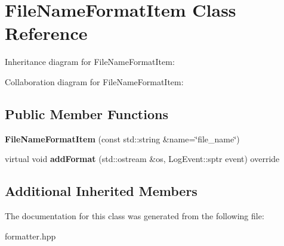 \hypertarget{classFileNameFormatItem}{}\section{File\+Name\+Format\+Item Class Reference}
\label{classFileNameFormatItem}


Inheritance diagram for File\+Name\+Format\+Item\+:


Collaboration diagram for File\+Name\+Format\+Item\+:
\subsection*{Public Member Functions}
\begin{DoxyCompactItemize}
\item 
\mbox{\label{classFileNameFormatItem_a0ce9e5a2c3065b3e7a9915c280705412}} 
{\bfseries File\+Name\+Format\+Item} (const std\+::string \&name=\char`\"{}file\+\_\+name\char`\"{})
\item 
\mbox{\label{classFileNameFormatItem_a5d332b2836a400d2aa002b0a7808dbcf}} 
virtual void {\bfseries add\+Format} (std\+::ostream \&os, Log\+Event\+::sptr event) override
\end{DoxyCompactItemize}
\subsection*{Additional Inherited Members}


The documentation for this class was generated from the following file\+:\begin{DoxyCompactItemize}
\item 
formatter.\+hpp\end{DoxyCompactItemize}
